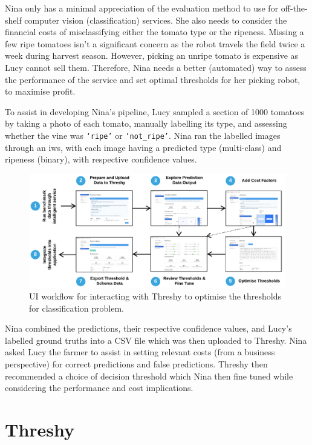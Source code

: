 Nina only has a minimal appreciation of the evaluation method to use for off-the-shelf computer vision (classification) services. She also needs to consider the financial costs of misclassifying either the tomato type or the ripeness. Missing a few ripe tomatoes isn't a significant concern as the robot travels the field twice a week during harvest season. However, picking an unripe tomato is expensive as Lucy cannot sell them. Therefore, Nina needs a better (automated) way to assess the performance of the service and set optimal thresholds for her picking robot, to maximise profit.

To assist in developing Nina's pipeline, Lucy sampled a section of 1000 tomatoes by taking a photo of each tomato, manually labelling its type, and assessing whether the vine was  \texttt{`ripe'} or \texttt{`not\_ripe'}. Nina ran the labelled images through an \gls{iws}, with each image having a predicted type (multi-class) and ripeness (binary), with respective confidence values. 

\begin{figure}[t!]
    \centering
    \includegraphics[width=\linewidth]{workflow}
    \caption[UI workflow of Threshy]{UI workflow for interacting with Threshy to optimise the thresholds for classification problem.}
    \label{fse-demo2020:fig:workflow}
\end{figure}

Nina combined the predictions, their respective confidence values, and Lucy's labelled ground truths into a CSV file which was then uploaded to Threshy. Nina asked Lucy the farmer to assist in setting relevant costs (from a business perspective) for correct predictions and false predictions. Threshy then recommended a choice of decision threshold which Nina then fine tuned while considering the performance and cost implications. 

\section{Threshy}
\label{fse-demo2020:sec:threshy}

